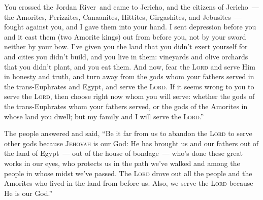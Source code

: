 \begin{inparaenum}
     You crossed the Jordan River\understood\ and came to Jericho, and the citizens of Jericho~--- the Amorites, Perizzites, Canaanites, Hittites, Girgashites, and Jebusites~--- fought against you, and I gave them into your hand.%
     I sent depression before you and it cast them (two Amorite kings) out from before you, not by your sword neither by your bow.%
     I've given you the land that you didn't exert yourself for and cities you didn't build, and you live in them: vineyards and olive orchards that you didn't plant, and you eat them.\understood%
     And now, fear the \textsc{Lord} and serve Him in honesty and truth, and turn away from the gods whom your fathers served in the trans-Euphrates and Egypt, and serve the \textsc{Lord}.%
     If it seems wrong to you to serve the \textsc{Lord}, then choose right now whom you will serve: whether the gods of the trans-Euphrates whom your fathers served, or the gods of the Amorites in whose land you dwell; but my family and I will serve the \textsc{Lord}.''%
    
     The people answered and said, ``Be it far from us to abandon the \textsc{Lord} to serve other gods%
     because \textsc{Jehovah} is our God: He has brought us and our fathers out of the land of Egypt~--- out of the house of bondage~--- who's done these great works in our eyes, who protects us in the path we've walked and among the people in whose midst we've passed.%
     The \textsc{Lord} drove out all the people and the Amorites who lived in the land from before us. Also, we serve the \textsc{Lord} because He is our God.''%
    

\end{inparaenum}

